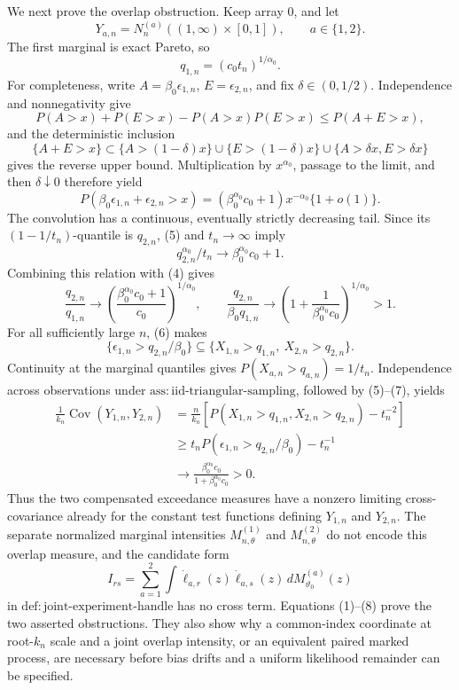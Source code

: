 We next prove the overlap obstruction.  Keep array \(0\), and let
\[
 Y_{a,n}=N_n^{(a)}((1,\infty)\times[0,1]),
 \qquad a\in\{1,2\}.
\]
The first marginal is exact Pareto, so
\[
 q_{1,n}=(c_0t_n)^{1/\alpha_0}. \tag{4}
\]
For completeness, write \(A=\beta_0\epsilon_{1,n}\), \(E=\epsilon_{2,n}\), and fix \(\delta\in(0,1/2)\).  Independence and nonnegativity give
\[
 P(A>x)+P(E>x)-P(A>x)P(E>x)
 \leq P(A+E>x),
\]
and the deterministic inclusion
\[
 \{A+E>x\}\subset
 \{A>(1-\delta)x\}\cup\{E>(1-\delta)x\}
 \cup\{A>\delta x,E>\delta x\}
\]
gives the reverse upper bound.  Multiplication by \(x^{\alpha_0}\), passage to the limit, and then \(\delta\downarrow0\) therefore yield
\[
 P(\beta_0\epsilon_{1,n}+\epsilon_{2,n}>x)
 =(\beta_0^{\alpha_0}c_0+1)x^{-\alpha_0}\{1+o(1)\}. \tag{5}
\]
The convolution has a continuous, eventually strictly decreasing tail.  Since its \((1-1/t_n)\)-quantile is \(q_{2,n}\), (5) and \(t_n\to\infty\) imply
\[
 q_{2,n}^{\alpha_0}/t_n\longrightarrow
 \beta_0^{\alpha_0}c_0+1.
\]
Combining this relation with (4) gives
\[
 \frac{q_{2,n}}{q_{1,n}}
 \longrightarrow
 \left(\frac{\beta_0^{\alpha_0}c_0+1}{c_0}\right)^{1/\alpha_0},
 \qquad
 \frac{q_{2,n}}{\beta_0q_{1,n}}
 \longrightarrow
 \left(1+\frac1{\beta_0^{\alpha_0}c_0}\right)^{1/\alpha_0}>1. \tag{6}
\]
For all sufficiently large \(n\), (6) makes
\[
 \{\epsilon_{1,n}>q_{2,n}/\beta_0\}
 \subseteq
 \{X_{1,n}>q_{1,n},\ X_{2,n}>q_{2,n}\}. \tag{7}
\]
Continuity at the marginal quantiles gives \(P(X_{a,n}>q_{a,n})=1/t_n\).  Independence across observations under \(\mathrm{ass{:}iid\text{-}triangular\text{-}sampling}\), followed by (5)--(7), yields
\[
\begin{aligned}
 \frac1{k_n}\operatorname{Cov}(Y_{1,n},Y_{2,n})
 &=\frac n{k_n}\left[
 P(X_{1,n}>q_{1,n},X_{2,n}>q_{2,n})-t_n^{-2}\right]\\
 &\geq t_nP(\epsilon_{1,n}>q_{2,n}/\beta_0)-t_n^{-1}\\
 &\longrightarrow
 \frac{\beta_0^{\alpha_0}c_0}{1+\beta_0^{\alpha_0}c_0}>0.
\end{aligned}\tag{8}
\]
Thus the two compensated exceedance measures have a nonzero limiting cross-covariance already for the constant test functions defining \(Y_{1,n}\) and \(Y_{2,n}\).  The separate normalized marginal intensities \(M_{n,\theta}^{(1)}\) and \(M_{n,\theta}^{(2)}\) do not encode this overlap measure, and the candidate form
\[
 I_{rs}=\sum_{a=1}^2\int
 \dot\ell_{a,r}(z)\dot\ell_{a,s}(z)\,dM_{\vartheta_0}^{(a)}(z)
\]
in \(\mathrm{def{:}joint\text{-}experiment\text{-}handle}\) has no cross term.  Equations (1)--(8) prove the two asserted obstructions.  They also show why a common-index coordinate at root-\(k_n\) scale and a joint overlap intensity, or an equivalent paired marked process, are necessary before bias drifts and a uniform likelihood remainder can be specified.